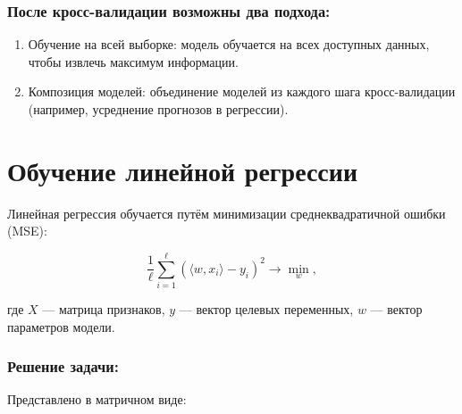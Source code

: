 \hypertarget{ux43fux43eux441ux43bux435-ux43aux440ux43eux441ux441-ux432ux430ux43bux438ux434ux430ux446ux438ux438-ux432ux43eux437ux43cux43eux436ux43dux44b-ux434ux432ux430-ux43fux43eux434ux445ux43eux434ux430}{%
\subsubsection*{После кросс-валидации возможны два
подхода:}\label{ux43fux43eux441ux43bux435-ux43aux440ux43eux441ux441-ux432ux430ux43bux438ux434ux430ux446ux438ux438-ux432ux43eux437ux43cux43eux436ux43dux44b-ux434ux432ux430-ux43fux43eux434ux445ux43eux434ux430}}

\begin{enumerate}
\def\labelenumi{\arabic{enumi}.}
\tightlist
\item
  Обучение на всей выборке: модель обучается на всех доступных
  данных, чтобы извлечь максимум информации.
\item
  Композиция моделей: объединение моделей из каждого шага
  кросс-валидации (например, усреднение прогнозов в регрессии).
\end{enumerate}

\hypertarget{ux43eux431ux443ux447ux435ux43dux438ux435-ux43bux438ux43dux435ux439ux43dux43eux439-ux440ux435ux433ux440ux435ux441ux441ux438ux438}{%
\section{Обучение линейной
регрессии}\label{ux43eux431ux443ux447ux435ux43dux438ux435-ux43bux438ux43dux435ux439ux43dux43eux439-ux440ux435ux433ux440ux435ux441ux441ux438ux438}}

Линейная регрессия обучается путём минимизации среднеквадратичной ошибки
(MSE):

\begin{equation}
\frac{1}{\ell} \sum_{i=1}^\ell (\langle w, x_i \rangle - y_i)^2 \to \min_w,
\end{equation}

где \(X\) --- матрица признаков, \(y\) --- вектор целевых переменных,
\(w\) --- вектор параметров модели.

\hypertarget{ux440ux435ux448ux435ux43dux438ux435-ux437ux430ux434ux430ux447ux438}{%
\subsubsection*{Решение
задачи:}\label{ux440ux435ux448ux435ux43dux438ux435-ux437ux430ux434ux430ux447ux438}}

Представлено в матричном виде:

